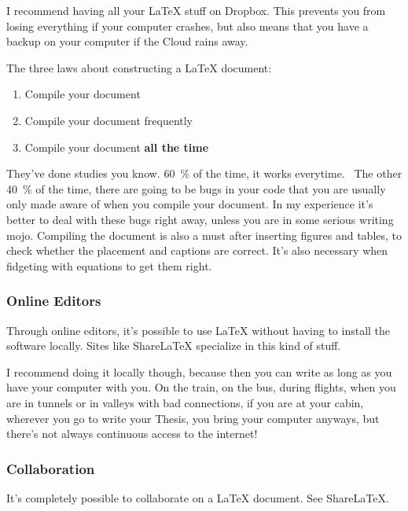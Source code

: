 I recommend having all your \LaTeX{} stuff on Dropbox. This prevents you from losing everything if your computer crashes, but also means that you have a backup on your computer if the Cloud rains away.

The three laws about constructing a \LaTeX{} document:

\begin{enumerate}
	\item Compile your document
	\item Compile your document frequently
	\item Compile your document \textbf{all the time}
\end{enumerate}

They've done studies you know. \SI{60}{\percent} of the time, it works everytime.~\cite{rudd.2004} The other \SI{40}{\percent} of the time, there are going to be bugs in your code that you are usually only made aware of when you compile your document. In my experience it's better to deal with these bugs right away, unless you are in some serious writing mojo. Compiling the document is also a must after inserting figures and tables, to check whether the placement and captions are correct. It's also necessary when fidgeting with equations to get them right.



\subsubsection{Online Editors}\label{sec.onlineeditors}

Through online editors, it's possible to use \LaTeX{} without having to install the software locally. Sites like ShareLaTeX specialize in this kind of stuff.~\cite{web.sharelatex}

I recommend doing it locally though, because then you can write as long as you have your computer with you. On the train, on the bus, during flights, when you are in tunnels or in valleys with bad connections, if you are at your cabin, wherever you go to write your Thesis, you bring your computer anyways, but there's not always continuous access to the internet!

\subsubsection{Collaboration}\label{sec.collaboration}

It's completely possible to collaborate on a \LaTeX{} document. See ShareLaTeX.~\cite{web.sharelatex}


	
	
	
	
	
	